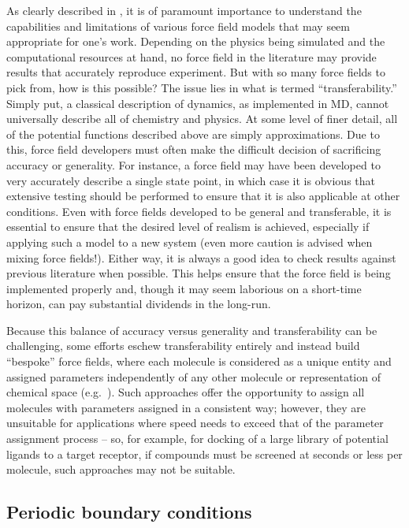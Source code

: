 \documentclass[9pt,bestpractices]{livecoms}
\begin{document}
As clearly described in \citet{Becker2013}, it is of paramount importance to understand the capabilities and limitations of various force field models that may seem appropriate for one's work. 
Depending on the physics being simulated and the computational resources at hand, no force field in the literature may provide results that accurately reproduce experiment.
But with so many force fields to pick from, how is this possible?
The issue lies in what is termed ``transferability.'' 
Simply put, a classical description of dynamics, as implemented in MD, cannot universally describe all of chemistry and physics. 
At some level of finer detail, all of the potential functions described above are simply approximations.
Due to this, force field developers must often make the difficult decision of sacrificing accuracy or generality. 
For instance, a force field may have been developed to very accurately describe a single state point, in which case it is obvious that extensive testing should be performed to ensure that it is also applicable at other conditions.
Even with force fields developed to be general and transferable, it is essential to ensure that the desired level of realism is achieved, especially if applying such a model to a new system (even more caution is advised when mixing force fields!).
Either way, it is always a good idea to check results against previous literature when possible.
This helps ensure that the force field is being implemented properly and, though it may seem laborious on a short-time horizon, can pay substantial dividends in the long-run.

Because this balance of accuracy versus generality and transferability can be challenging, some efforts eschew transferability entirely and instead build ``bespoke'' force fields, where each molecule is considered as a unique entity and assigned parameters independently of any other molecule or representation of chemical space (e.g.~\cite{Dupradeau:2010:Phys.Chem.Chem.Phys.}).
Such approaches offer the opportunity to assign all molecules with parameters assigned in a consistent way; however, they are unsuitable for applications where speed needs to exceed that of the parameter assignment process -- so, for example, for docking of a large library of potential ligands to a target receptor, if compounds must be screened at seconds or less per molecule, such approaches may not be suitable.


\subsection{Periodic boundary conditions}
\label{sec:periodic}
\end{document}

